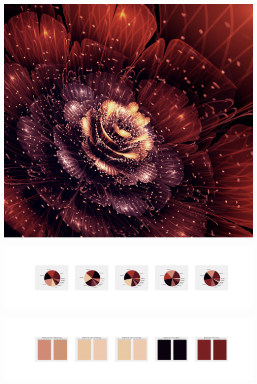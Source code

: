 \documentclass[11pt]{article}
\begin{document}
\begin{landscape}
    \begin{center}
    \includegraphics[width=\textwidth]{./nbimg/file (100).jpg}
    \end{center}

    \begin{center}
    \includegraphics[width=250mm]{./nbimg/pie-2.jpg}
    \end{center}

    \begin{center}
    \includegraphics[width=250mm]{./nbimg/peak-2.jpg}
    \end{center}
    


\end{landscape}
\end{document}

